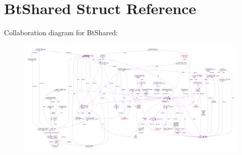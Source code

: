 \hypertarget{structBtShared}{}\section{Bt\+Shared Struct Reference}
\label{structBtShared}


Collaboration diagram for Bt\+Shared\+:\nopagebreak
\begin{figure}[H]
\begin{center}
\leavevmode
\includegraphics[width=350pt]{structBtShared__coll__graph}
\end{center}
\end{figure}

